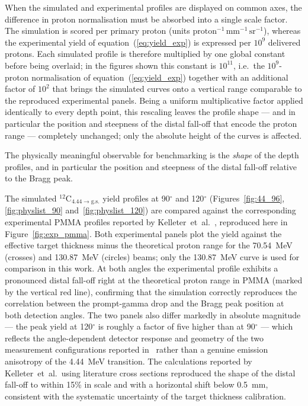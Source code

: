 \documentclass[a4paper]{article}
\begin{document}
When the simulated and experimental profiles are displayed on common axes, the difference in proton normalisation must be absorbed into a single scale factor. The simulation is scored per primary proton (units $\mathrm{proton^{-1}\,mm^{-1}\,sr^{-1}}$), whereas the experimental yield of equation~(\ref{eq:yield_exp}) is expressed per $10^9$ delivered protons. Each simulated profile is therefore multiplied by one global constant before being overlaid; in the figures shown this constant is $10^{11}$, i.e.\ the $10^9$-proton normalisation of equation~(\ref{eq:yield_exp}) together with an additional factor of $10^2$ that brings the simulated curves onto a vertical range comparable to the reproduced experimental panels. Being a uniform multiplicative factor applied identically to every depth point, this rescaling leaves the profile shape — and in particular the position and steepness of the distal fall-off that encode the proton range — completely unchanged; only the absolute height of the curves is affected.

The physically meaningful observable for benchmarking is the \emph{shape} of the depth profiles, and in particular the position and steepness of the distal fall-off relative to the Bragg peak.

The simulated $^{12}$C$_{4.44\to\mathrm{g.s.}}$ yield profiles at 90$^\circ$ and 120$^\circ$ (Figures~\ref{fig:44_96}, \ref{fig:physlist_90} and~\ref{fig:physlist_120}) are compared against the corresponding experimental PMMA profiles reported by Kelleter~et~al.~\cite{kelleter2017}, reproduced here in Figure~\ref{fig:exp_pmma}. Both experimental panels plot the yield against the effective target thickness minus the theoretical proton range for the 70.54~MeV (crosses) and 130.87~MeV (circles) beams; only the 130.87~MeV curve is used for comparison in this work. At both angles the experimental profile exhibits a pronounced distal fall-off right at the theoretical proton range in PMMA (marked by the vertical red line), confirming that the simulation correctly reproduces the correlation between the prompt-gamma drop and the Bragg peak position at both detection angles. The two panels also differ markedly in absolute magnitude — the peak yield at 120$^\circ$ is roughly a factor of five higher than at 90$^\circ$ — which reflects the angle-dependent detector response and geometry of the two measurement configurations reported in~\cite{kelleter2017} rather than a genuine emission anisotropy of the 4.44~MeV transition. The calculations reported by Kelleter~et~al.\ using literature cross sections reproduced the shape of the distal fall-off to within 15\% in scale and with a horizontal shift below 0.5~mm, consistent with the systematic uncertainty of the target thickness calibration.
\end{document}
